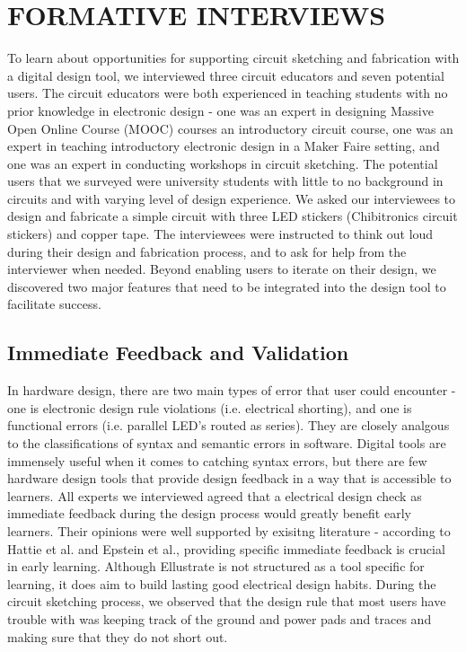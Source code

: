 \documentclass{sigchi}
\begin{document}


\section{FORMATIVE INTERVIEWS}
To learn about opportunities for supporting circuit sketching and fabrication with a digital design tool, we interviewed three circuit educators and seven potential users. The circuit educators were both experienced in teaching students with no prior knowledge in electronic design - one was an expert in designing Massive Open Online Course (MOOC) courses an introductory circuit course, one was an expert in teaching introductory electronic design in a Maker Faire setting, and one was an expert in conducting workshops in circuit sketching. The potential users that we surveyed were university students with little to no background in circuits and with varying level of design experience. We asked our interviewees to design and fabricate a simple circuit with three LED stickers (Chibitronics circuit stickers) and copper tape. The interviewees were instructed to think out loud during their design and fabrication process, and to ask for help from the interviewer when needed. Beyond  enabling users to iterate on their design, we discovered two major features that need to be integrated into the design tool to facilitate success. 

\subsection{Immediate Feedback and Validation}
In hardware design, there are two main types of error that user could encounter - one is electronic design rule violations (i.e. electrical shorting), and one is functional errors (i.e. parallel LED's routed as series). They are closely analgous to the classifications of syntax and semantic errors in software. Digital tools are immensely useful when it comes to catching syntax errors, but there are few hardware design tools that provide design feedback in a way that is accessible to learners. All experts we interviewed agreed that a electrical design check as immediate feedback during the design process would greatly benefit early learners. Their opinions were well supported by exisitng literature - according to Hattie et al. and Epstein et al., providing specific immediate feedback is crucial in early learning. Although Ellustrate is not structured as a tool specific for learning, it does aim to build lasting good electrical design habits. During the circuit sketching process, we observed that the design rule that most users have trouble with was keeping track of the ground and power pads and traces and making sure that they do not short out. 
\end{document}
